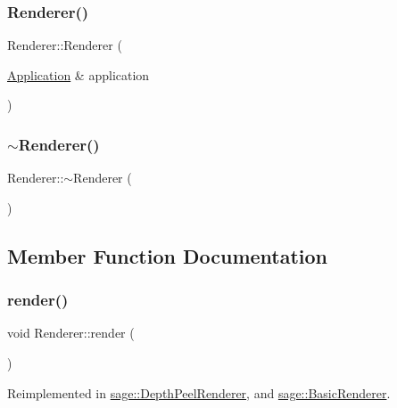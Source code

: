 \subsubsection{\texorpdfstring{Renderer()}{Renderer()}}
{\footnotesize\ttfamily Renderer\+::\+Renderer (\begin{DoxyParamCaption}\item[{\mbox{\hyperlink{classsage_1_1Application}{Application}} \&}]{application }\end{DoxyParamCaption})}

\mbox{\label{classsage_1_1Renderer_afeee408862d5bd6255a6882d47e6d5cd}} 
\subsubsection{\texorpdfstring{$\sim$Renderer()}{~Renderer()}}
{\footnotesize\ttfamily Renderer\+::$\sim$\+Renderer (\begin{DoxyParamCaption}{ }\end{DoxyParamCaption})\hspace{0.3cm}{\ttfamily [virtual]}}



\subsection{Member Function Documentation}
\mbox{\label{classsage_1_1Renderer_af7e5f8f68742f198e315fb4683a605a4}} 
\subsubsection{\texorpdfstring{render()}{render()}\hspace{0.1cm}{\footnotesize\ttfamily [1/3]}}
{\footnotesize\ttfamily void Renderer\+::render (\begin{DoxyParamCaption}{ }\end{DoxyParamCaption})\hspace{0.3cm}{\ttfamily [virtual]}}



Reimplemented in \mbox{\hyperlink{classsage_1_1DepthPeelRenderer_a84443362d98ad685cac1f2558c9445ee}{sage\+::\+Depth\+Peel\+Renderer}}, and \mbox{\hyperlink{classsage_1_1BasicRenderer_a127bbe33d8ef13fc64ff2e3943c0636b}{sage\+::\+Basic\+Renderer}}.

